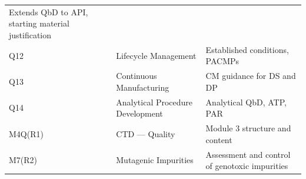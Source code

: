 \documentclass[
  11pt,
  a4paper,
]{report}
\begin{document}
\begin{longtable}[]{@{}lll@{}}
\begin{minipage}[t]{0.41\columnwidth}
Extends QbD to API, starting material justification\strut
\end{minipage}\tabularnewline
\begin{minipage}[t]{0.30\columnwidth}\raggedright
Q12\strut
\end{minipage} & \begin{minipage}[t]{0.19\columnwidth}\raggedright
Lifecycle Management\strut
\end{minipage} & \begin{minipage}[t]{0.41\columnwidth}\raggedright
Established conditions, PACMPs\strut
\end{minipage}\tabularnewline
\begin{minipage}[t]{0.30\columnwidth}\raggedright
Q13\strut
\end{minipage} & \begin{minipage}[t]{0.19\columnwidth}\raggedright
Continuous Manufacturing\strut
\end{minipage} & \begin{minipage}[t]{0.41\columnwidth}\raggedright
CM guidance for DS and DP\strut
\end{minipage}\tabularnewline
\begin{minipage}[t]{0.30\columnwidth}\raggedright
Q14\strut
\end{minipage} & \begin{minipage}[t]{0.19\columnwidth}\raggedright
Analytical Procedure Development\strut
\end{minipage} & \begin{minipage}[t]{0.41\columnwidth}\raggedright
Analytical QbD, ATP, PAR\strut
\end{minipage}\tabularnewline
\begin{minipage}[t]{0.30\columnwidth}\raggedright
M4Q(R1)\strut
\end{minipage} & \begin{minipage}[t]{0.19\columnwidth}\raggedright
CTD --- Quality\strut
\end{minipage} & \begin{minipage}[t]{0.41\columnwidth}\raggedright
Module 3 structure and content\strut
\end{minipage}\tabularnewline
\begin{minipage}[t]{0.30\columnwidth}\raggedright
M7(R2)\strut
\end{minipage} & \begin{minipage}[t]{0.19\columnwidth}\raggedright
Mutagenic Impurities\strut
\end{minipage} & \begin{minipage}[t]{0.41\columnwidth}\raggedright
Assessment and control of genotoxic impurities\strut
\end{minipage}\tabularnewline
\bottomrule
\end{longtable}
\end{document}
